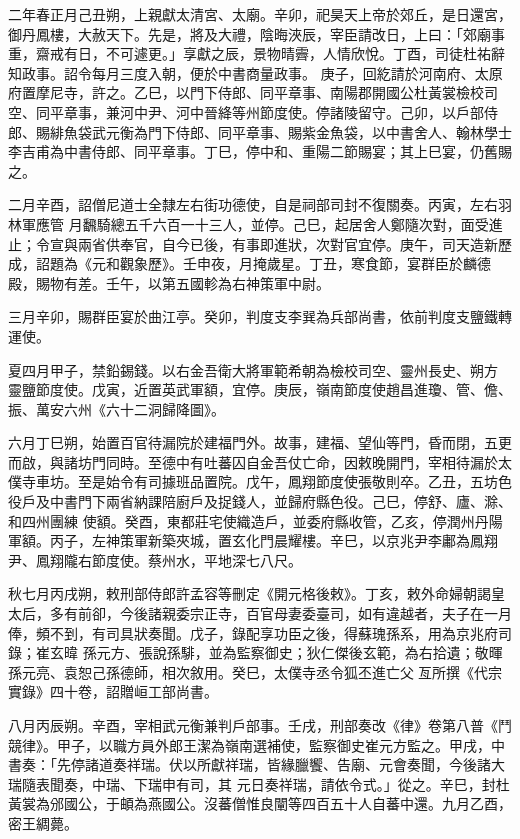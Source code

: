 \begin{pinyinscope}
 二年春正月己丑朔，上親獻太清宮、太廟。辛卯，祀昊天上帝於郊丘，是日還宮，御丹鳳樓，大赦天下。先是，將及大禮，陰晦浹辰，宰臣請改日，上曰：「郊廟事重，齋戒有日，不可遽更。」享獻之辰，景物晴霽，人情欣悅。丁酉，司徒杜祐辭知政事。詔令每月三度入朝，便於中書商量政事。
 庚子，回紇請於河南府、太原府置摩尼寺，許之。乙巳，以門下侍郎、同平章事、南陽郡開國公杜黃裳檢校司空、同平章事，兼河中尹、河中晉絳等州節度使。停諸陵留守。己卯，以戶部侍郎、賜緋魚袋武元衡為門下侍郎、同平章事、賜紫金魚袋，以中書舍人、翰林學士李吉甫為中書侍郎、同平章事。丁巳，停中和、重陽二節賜宴；其上巳宴，仍舊賜之。



 二月辛酉，詔僧尼道士全隸左右街功德使，自是祠部司封不復關奏。丙寅，左右羽林軍應管
 月飜騎總五千六百一十三人，並停。己巳，起居舍人鄭隨次對，面受進止；令宣與兩省供奉官，自今已後，有事即進狀，次對官宜停。庚午，司天造新歷成，詔題為《元和觀象歷》。壬申夜，月掩歲星。丁丑，寒食節，宴群臣於麟德殿，賜物有差。壬午，以第五國軫為右神策軍中尉。



 三月辛卯，賜群臣宴於曲江亭。癸卯，判度支李巽為兵部尚書，依前判度支鹽鐵轉運使。



 夏四月甲子，禁鉛錫錢。以右金吾衛大將軍範希朝為檢校司空、靈州長史、朔方
 靈鹽節度使。戊寅，近置英武軍額，宜停。庚辰，嶺南節度使趙昌進瓊、管、儋、振、萬安六州《六十二洞歸降圖》。



 六月丁巳朔，始置百官待漏院於建福門外。故事，建福、望仙等門，昏而閉，五更而啟，與諸坊門同時。至德中有吐蕃囚自金吾仗亡命，因敕晚開門，宰相待漏於太僕寺車坊。至是始令有司據班品置院。戊午，鳳翔節度使張敬則卒。乙丑，五坊色役戶及中書門下兩省納課陪廚戶及捉錢人，並歸府縣色役。己巳，停舒、廬、滁、和四州團練
 使額。癸酉，東都莊宅使織造戶，並委府縣收管，乙亥，停潤州丹陽軍額。丙子，左神策軍新築夾城，置玄化門晨耀樓。辛巳，以京兆尹李鄘為鳳翔尹、鳳翔隴右節度使。蔡州水，平地深七八尺。



 秋七月丙戌朔，敕刑部侍郎許孟容等刪定《開元格後敕》。丁亥，敕外命婦朝謁皇太后，多有前卻，今後諸親委宗正寺，百官母妻委臺司，如有違越者，夫子在一月俸，頻不到，有司具狀奏聞。戊子，錄配享功臣之後，得蘇瑰孫系，用為京兆府司錄；崔玄暐
 孫元方、張說孫騑，並為監察御史；狄仁傑後玄範，為右拾遺；敬暉孫元亮、袁恕己孫德師，相次敘用。癸巳，太僕寺丞令狐丕進亡父亙所撰《代宗實錄》四十卷，詔贈峘工部尚書。



 八月丙辰朔。辛酉，宰相武元衡兼判戶部事。壬戌，刑部奏改《律》卷第八普《鬥競律》。甲子，以職方員外郎王潔為嶺南選補使，監察御史崔元方監之。甲戌，中書奏：「先停諸道奏祥瑞。伏以所獻祥瑞，皆緣臘饗、告廟、元會奏聞，今後諸大瑞隨表聞奏，中瑞、下瑞申有司，其
 元日奏祥瑞，請依令式。」從之。辛巳，封杜黃裳為邠國公，于頔為燕國公。沒蕃僧惟良闡等四百五十人自蕃中還。九月乙酉，密王綢薨。




\end{pinyinscope}
